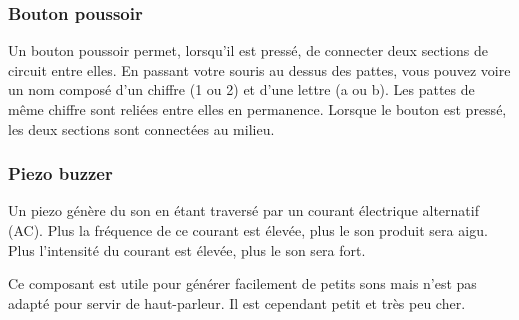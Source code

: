 \subsubsection{Bouton poussoir}

Un bouton poussoir permet, lorsqu'il est pressé, de connecter deux sections de circuit entre elles.
En passant votre souris au dessus des pattes, vous pouvez voire un nom composé d'un chiffre (1 ou 2) et d'une lettre (a ou b).
Les pattes de même chiffre sont reliées entre elles en permanence.
Lorsque le bouton est pressé, les deux sections sont connectées au milieu.


\subsubsection{Piezo buzzer}

Un piezo génère du son en étant traversé par un courant électrique alternatif (AC).
Plus la fréquence de ce courant est élevée, plus le son produit sera aigu.
Plus l'intensité du courant est élevée, plus le son sera fort.

Ce composant est utile pour générer facilement de petits sons mais n'est pas adapté pour servir de haut-parleur.
Il est cependant petit et très peu cher.

